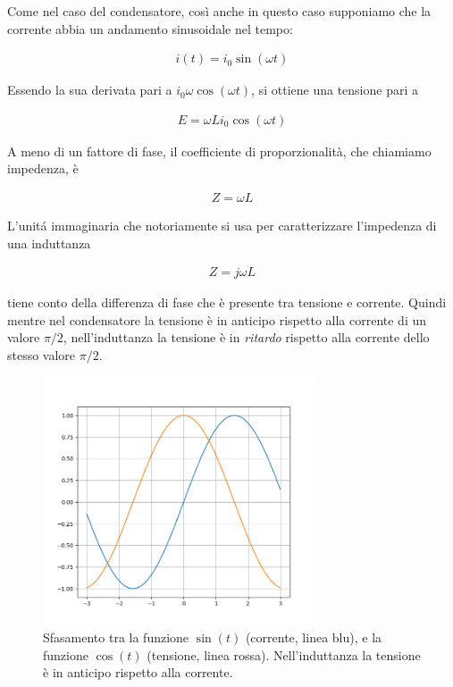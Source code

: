 \documentclass[17pt]{extarticle}
\begin{document}
\begin{enumerate}
 


Come nel caso del condensatore, così anche in questo caso supponiamo che la corrente abbia un andamento sinusoidale nel tempo:

\begin{eqnarray}
	i(t) = i_0 \sin(\omega t)
\end{eqnarray}

Essendo la sua derivata pari a $i_0\omega \cos(\omega t)$, si ottiene una tensione pari a

\begin{eqnarray}
	E = \omega L i_0\cos(\omega t)
\end{eqnarray}

A meno di un fattore di fase, il coefficiente di proporzionalità, che chiamiamo impedenza, è 

\begin{eqnarray}
	Z = \omega L
\end{eqnarray}

L'unit\'a immaginaria che notoriamente si usa per caratterizzare l'impedenza di una induttanza

\begin{eqnarray}
	Z = j\omega L
\end{eqnarray}

 tiene conto della differenza di fase che è presente tra tensione e corrente. Quindi mentre nel condensatore la tensione è in anticipo rispetto alla corrente di un valore $\pi/2$, nell'induttanza la tensione è in \emph{ritardo} rispetto alla corrente dello stesso valore $\pi/2$.


\begin{figure}[b!]		
	\centering
   	\includegraphics[width=3.2in]{sfasamento1.png}
  	\caption{Sfasamento tra la funzione $\sin(t)$ (corrente, linea blu), e la funzione $\cos(t)$ (tensione, linea rossa). Nell'induttanza la tensione è in anticipo rispetto alla corrente.}
   	\label{fig:sfasamento1}
\end{figure}%





\end{enumerate}
\end{document}
